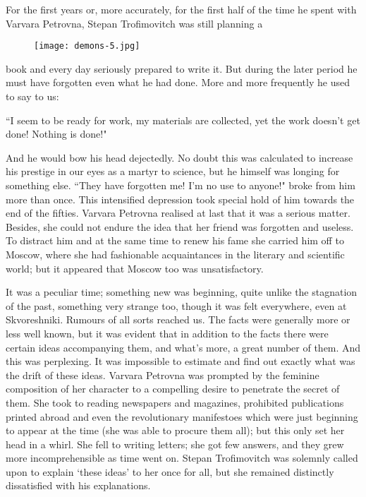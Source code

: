 \documentclass[12pt]{article}
\begin{document}
\vspace{12pt}
For the first years or, more accurately, for the first half of the time
he spent with Varvara Petrovna, Stepan Trofimovitch was still planning a
\begin{figure}[!ht]
\begin{center}
\texttt{[image: demons-5.jpg]}
\end{center}
\end{figure}
book and every day seriously prepared to write it. But during the later
period he must have forgotten even what he had done. More and more
frequently he used to say to us:


\vspace{12pt}
``I seem to be ready for work, my materials are collected, yet the work
doesn't get done! Nothing is done!"


\vspace{12pt}
And he would bow his head dejectedly. No doubt this was calculated
to increase his prestige in our eyes as a martyr to science, but he
himself was longing for something else. ``They have forgotten me! I'm
no use to anyone!" broke from him more than once. This intensified
depression took special hold of him towards the end of the fifties.
Varvara Petrovna realised at last that it was a serious matter. Besides,
she could not endure the idea that her friend was forgotten and useless.
To distract him and at the same time to renew his fame she carried him
off to Moscow, where she had fashionable acquaintances in the
literary and scientific world; but it appeared that Moscow too was
unsatisfactory.


\vspace{12pt}
It was a peculiar time; something new was beginning, quite unlike the
stagnation of the past, something very strange too, though it was felt
everywhere, even at Skvoreshniki. Rumours of all sorts reached us. The
facts were generally more or less well known, but it was evident that
in addition to the facts there were certain ideas accompanying them,
and what's more, a great number of them. And this was perplexing. It was
impossible to estimate and find out exactly what was the drift of these
ideas. Varvara Petrovna was prompted by the feminine composition of her
character to a compelling desire to penetrate the secret of them.
She took to reading newspapers and magazines, prohibited publications
printed abroad and even the revolutionary manifestoes which were just
beginning to appear at the time (she was able to procure them all); but
this only set her head in a whirl. She fell to writing letters; she got
few answers, and they grew more incomprehensible as time went on. Stepan
Trofimovitch was solemnly called upon to explain `these ideas' to
her once for all, but she remained distinctly dissatisfied with his
explanations.
\end{document}
